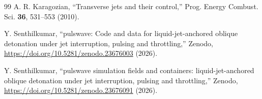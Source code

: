 \documentclass[aip,pof,preprint,amsmath,amssymb]{revtex4-2}
\begin{document}
\begin{thebibliography}{99}
 A. R. Karagozian, ``Transverse jets and their control,'' Prog. Energy Combust. Sci. \textbf{36}, 531--553 (2010).

 Y. Senthilkumar, ``pulswave: Code and data for liquid-jet-anchored oblique detonation under jet interruption, pulsing and throttling,'' Zenodo, \url{https://doi.org/10.5281/zenodo.23676003} (2026).

 Y. Senthilkumar, ``pulswave simulation fields and containers: liquid-jet-anchored oblique detonation under jet interruption, pulsing and throttling,'' Zenodo, \url{https://doi.org/10.5281/zenodo.23676091} (2026).

\end{thebibliography}
\end{document}
